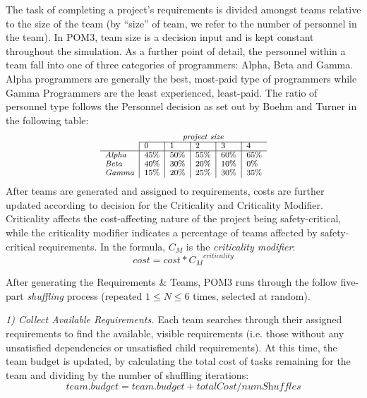 \documentclass[10pt,journal,compsoc]{IEEEtran}
\begin{document}
The task of completing a project's requirements is divided amongst teams
    relative to the size of the team (by ``size'' of team, we refer to
    the number of personnel in the team).  In POM3, team size is a decision
    input and is kept constant throughout the simulation.  As a further
    point of detail, the personnel within a team fall into one of three
    categories of programmers: Alpha, Beta and Gamma.  Alpha programmers
    are generally the best, most-paid type of programmers while Gamma
    Programmers are the least experienced, least-paid.  The ratio of personnel type
    follows the Personnel decision as set out by Boehm and Turner\cite{1204376} in the following table:    
    \[\scriptsize
    \begin{array}{l|l|l|l|l|l}
             \multicolumn{1}{c}{~}   & \multicolumn{5}{c}{\textit{project size}}\\\cline{2-6}
                & 0    & 1    & 2    & 3    & 4    \\ \hline
            \textit{Alpha} & 45\% & 50\% & 55\% & 60\% & 65\% \\ 
            \textit{Beta}  & 40\% & 30\% & 20\% & 10\% & 0\%  \\ 
            \textit{Gamma} & 15\% & 20\% & 25\% & 30\% & 35\% \\ 
        \end{array}
    \]
    After teams are generated and assigned to requirements, costs are
    further updated according to decision for the Criticality and
    Criticality Modifier.  Criticality affects the
    cost-affecting nature of the project being safety-critical, while the
    criticality modifier indicates a percentage of teams affected by
    safety-critical requirements.  In the formula, $C_M$ is the {\em criticality
    modifier}:
    \begin{equation}\label{eq:cmcrit}
    \textit{cost} = \textit{cost} * {C_M}^{\textit{criticality}}
    \end{equation}
    
After generating the Requirements \& Teams, POM3 runs through the follow five-part {\em shuffling} process (repeated   \mbox{$1 \le N \le 6$} times, selected at random).
    
    {\em 1) Collect Available Requirements.} Each team searches through
    their assigned requirements to find the available, visible
    requirements (i.e. those without any  unsatisfied dependencies
    or unsatisfied child requirements).  At this time, the team budget
    is updated, by calculating the total cost of tasks remaining for the
    team and dividing by the number of shuffling iterations:
    \[\textit{team.budget} = \textit{team.budget} + \textit{totalCost/numShuffles}\]
    
\end{document}
